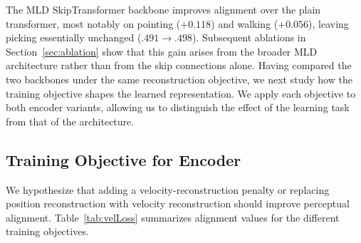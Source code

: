 \documentclass[letterpaper]{article} %
\begin{document}
The MLD SkipTransformer backbone improves alignment over the plain transformer, most notably on
pointing ($+0.118$) and walking ($+0.056$), leaving picking essentially unchanged ($.491 \to .498$). Subsequent ablations in Section~\ref{sec:ablation} show that this gain arises from the broader MLD architecture rather than from the skip connections alone. Having compared the two backbones under the same reconstruction objective, we next study how the training objective shapes the learned representation. We apply each objective to both encoder variants, allowing us to distinguish the effect of the learning task from that of the architecture.


\subsection{Training Objective for Encoder}
We hypothesize that adding a velocity-reconstruction penalty or replacing position reconstruction with velocity reconstruction should improve perceptual alignment. Table~\ref{tab:velLoss} summarizes alignment values for the different training objectives.

\end{document}

